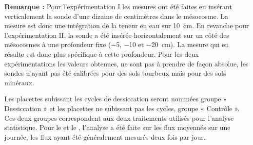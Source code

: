 \begin{center}
\begin{minipage}{.85\textwidth}
\setlength{\parindent}{-10pt}%
\onehalfspacing
\textbf{Remarque :} %
Pour l'expérimentation I les mesures ont été faites en insérant verticalement la sonde d'une dizaine de centimètres dans le mésocosme.
La mesure est donc une intégration de la teneur en eau sur \SI{10}{\centi\metre}.
En revanche pour l'expérimentation II, la sonde a été insérée horizontalement sur un côté des mésocosmes à une profondeur fixe (\num{-5}, \num{-10} et \SI{-20}{\centi\metre}).
La mesure qui en résulte est donc plus spécifique à cette profondeur.
Pour les deux expérimentations les valeurs obtenues, ne sont pas à prendre de façon absolue, les sondes n'ayant pas été calibrées pour des sols tourbeux mais pour des sols minéraux.
\end{minipage}
\end{center}
Les placettes subissant les cycles de dessiccation seront nommées groupe « Dessiccation » et les placettes ne subissant pas les cycles, groupe « Contrôle ».
Ces deux groupes correspondent aux deux traitements utilisés pour l'analyse statistique.
Pour le \coo et le \chh, l'analyse a été faite sur les flux moyennés sur une journée, les flux ayant été généralement mesurés deux fois par jour.



